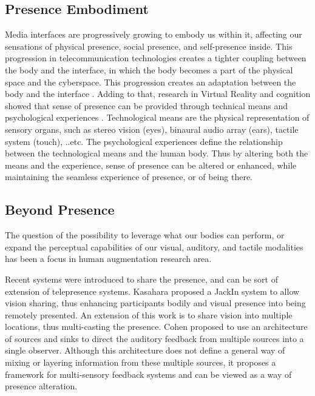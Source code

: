 \subsection{Presence Embodiment}

Media interfaces are progressively growing to embody us within it, affecting our sensations of physical presence, social presence, and self-presence inside. This progression in telecommunication technologies creates a tighter coupling between the body and the interface, in which the body becomes a part of the physical space and the cyberspace. This progression creates an adaptation between the body and the interface \cite{biocca1997cyborg}. Adding to that, research in Virtual Reality and cognition showed that sense of presence can be provided through technical means and psychological experiences \cite{riva2006communication}. Technological means are the physical representation of sensory organs, such as stereo vision (eyes), binaural audio array (ears), tactile system (touch), ..etc. The psychological experiences define the relationship between the technological means and the human body. Thus by altering both the means and the experience, sense of presence can be altered or enhanced, while maintaining the seamless experience of presence, or of being there.


\subsection{Beyond Presence}

The question of the possibility to leverage what our bodies can perform, or expand the perceptual capabilities of our visual, auditory, and tactile modalities has been a focus in human augmentation research area.

Recent systems were introduced to share the presence, and can be sort of extension of telepresence systems. Kasahara \cite{kasahara2014jackin} proposed a JackIn system to allow vision sharing, thus enhancing participants bodily and visual presence into being remotely presented. An extension of this work \cite{kasahara2016parallel} is to share vision into multiple locations, thus multi-casting the presence. Cohen \cite{cohen2007multiuser,cohen2009awareware} proposed to use an architecture of sources and sinks to direct the auditory feedback from multiple sources into a single observer. Although this architecture does not define a general way of mixing or layering information from these multiple sources, it proposes a framework for multi-sensory feedback systems and can be viewed as a way of presence alteration.

